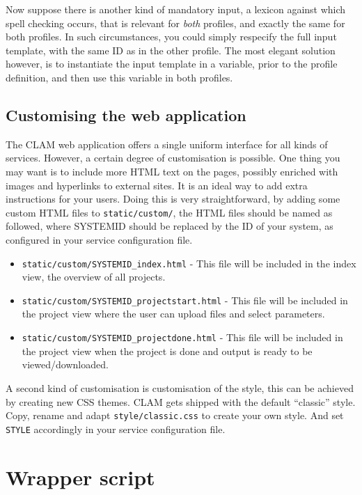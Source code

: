 \documentclass[a4paper,12pt]{report}
\begin{document}
Now suppose there is another kind of mandatory input, a lexicon against which spell checking occurs, that is relevant for \emph{both} profiles, and exactly the same for both profiles. In such circumstances, you could simply respecify the full input template, with the same ID as in the other profile. The most elegant solution however, is to instantiate the input template in a variable, prior to the profile definition, and then use this variable in both profiles.

\subsection{Customising the web application}

The CLAM web application offers a single uniform interface for all kinds of services. However, a certain degree of customisation is possible. One thing you may want is to include more HTML text on the pages, possibly enriched with images and hyperlinks to external sites. It is an ideal way to add extra instructions for your users. Doing this is very straightforward, by adding some custom HTML files to \texttt{static/custom/}, the HTML files should be named as followed, where SYSTEMID should be replaced by the ID of your system, as configured in your service configuration file.

\begin{itemize}
\item \texttt{static/custom/SYSTEMID_index.html} - This file will be included in the index view, the overview of all projects.
\item \texttt{static/custom/SYSTEMID_projectstart.html} - This file will be included in the project view where the user can upload files and select parameters.
\item \texttt{static/custom/SYSTEMID_projectdone.html} - This file will be included in the project view when the project is done and output is ready to be viewed/downloaded.
\end{itemize}

A second kind of customisation is customisation of the style, this can be achieved by creating new CSS themes. CLAM gets shipped with the default ``classic'' style. Copy, rename and adapt \texttt{style/classic.css} to create your own style. And set \texttt{STYLE} accordingly in your service configuration file.

\section{Wrapper script}
\end{document}
